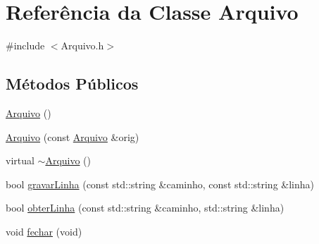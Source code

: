 \hypertarget{class_arquivo}{
\section{Referência da Classe Arquivo}
\label{class_arquivo}
}


{\ttfamily \#include $<$Arquivo.h$>$}

\subsection*{Métodos Públicos}
\begin{DoxyCompactItemize}
\item 
\hyperlink{class_arquivo_a0a08495066e1ff58307a06433af83d69}{Arquivo} ()
\item 
\hyperlink{class_arquivo_a30d5d806b8bf459db32e8eed23e8d44f}{Arquivo} (const \hyperlink{class_arquivo}{Arquivo} \&orig)
\item 
virtual \hyperlink{class_arquivo_adbb299f34929877d20f453cacc648bb1}{$\sim$Arquivo} ()
\item 
bool \hyperlink{class_arquivo_aad63dd72e2d02ca704d5b5c98c53b290}{gravarLinha} (const std::string \&caminho, const std::string \&linha)
\item 
bool \hyperlink{class_arquivo_acc0ff0215347643dd56ab1089da1d2d9}{obterLinha} (const std::string \&caminho, std::string \&linha)
\item 
void \hyperlink{class_arquivo_ab1a811454f0ff83c90b32b4d9964249a}{fechar} (void)
\end{DoxyCompactItemize}


